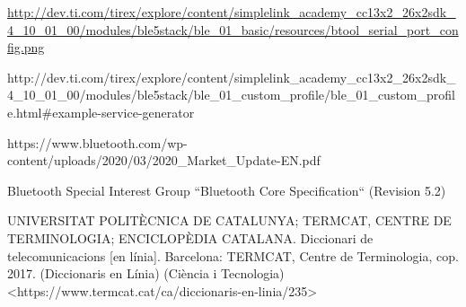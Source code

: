 \begin{thebibliography}{2}
\href{http://dev.ti.com/tirex/explore/content/simplelink_academy_cc13x2_26x2sdk_4_10_01_00/modules/ble5stack/ble_01\_basic/resources/btool_serial_port_config.png}{http://dev.ti.com/tirex/explore/content/simplelink\_academy\_cc13x2\_26x2sdk\_4\_10\_01\_00/modules/ble5stack/ble\_01\_basic/resources/btool\_serial\_port\_config.png}

http://dev.ti.com/tirex/explore/content/simplelink\_academy\_cc13x2\_26x2sdk\_4\_10\_01\_00/modules/ble5stack/ble\_01\_custom\_profile/ble\_01\_custom\_profile.html\#example-service-generator

https://www.bluetooth.com/wp-content/uploads/2020/03/2020\_Market\_Update-EN.pdf

Bluetooth Special Interest Group
``Bluetooth Core Specification``
(Revision 5.2)

UNIVERSITAT POLITÈCNICA DE CATALUNYA; TERMCAT, CENTRE DE TERMINOLOGIA; ENCICLOPÈDIA CATALANA. Diccionari de telecomunicacions [en línia]. Barcelona: TERMCAT, Centre de Terminologia, cop. 2017. (Diccionaris en Línia) (Ciència i Tecnologia)
<https://www.termcat.cat/ca/diccionaris-en-linia/235>

\end{thebibliography}